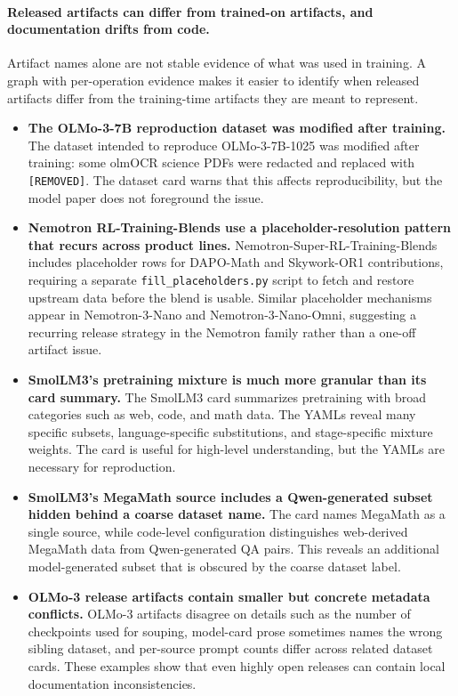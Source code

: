 \paragraph{Released artifacts can differ from trained-on artifacts, and documentation drifts from code.}

Artifact names alone are not stable evidence of what was used in training. A graph with per-operation evidence makes it easier to identify when released artifacts differ from the training-time artifacts they are meant to represent.

\begin{itemize}
    \item \textbf{The OLMo-3-7B reproduction dataset was modified after training.}
    The dataset intended to reproduce OLMo-3-7B-1025 was modified after training: some olmOCR science PDFs were redacted and replaced with \texttt{[REMOVED]}. The dataset card warns that this affects reproducibility, but the model paper does not foreground the issue.

    \item \textbf{Nemotron RL-Training-Blends use a placeholder-resolution pattern that recurs across product lines.}
    Nemotron-Super-RL-Training-Blends includes placeholder rows for DAPO-Math and Skywork-OR1 contributions, requiring a separate \texttt{fill\_placeholders.py} script to fetch and restore upstream data before the blend is usable. Similar placeholder mechanisms appear in Nemotron-3-Nano and Nemotron-3-Nano-Omni, suggesting a recurring release strategy in the Nemotron family rather than a one-off artifact issue.

    \item \textbf{SmolLM3's pretraining mixture is much more granular than its card summary.}
    The SmolLM3 card summarizes pretraining with broad categories such as web, code, and math data. The YAMLs reveal many specific subsets, language-specific substitutions, and stage-specific mixture weights. The card is useful for high-level understanding, but the YAMLs are necessary for reproduction.

    \item \textbf{SmolLM3's MegaMath source includes a Qwen-generated subset hidden behind a coarse dataset name.}
    The card names MegaMath as a single source, while code-level configuration distinguishes web-derived MegaMath data from Qwen-generated QA pairs. This reveals an additional model-generated subset that is obscured by the coarse dataset label.

    \item \textbf{OLMo-3 release artifacts contain smaller but concrete metadata conflicts.}
    OLMo-3 artifacts disagree on details such as the number of checkpoints used for souping, model-card prose sometimes names the wrong sibling dataset, and per-source prompt counts differ across related dataset cards. These examples show that even highly open releases can contain local documentation inconsistencies.
\end{itemize}

